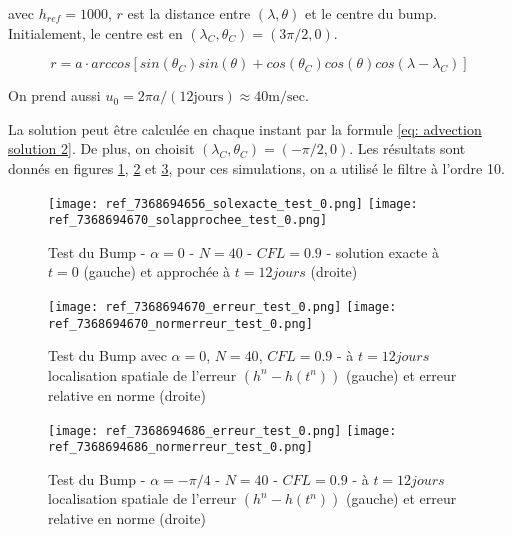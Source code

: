 avec $h_{ref}=1000$, $r$ est la distance entre $(\lambda, \theta)$ et le centre du bump. Initialement, le centre est en $(\lambda_C, \theta_C) = (3 \pi /2, 0)$.

\begin{equation}
r = a \cdot arccos \left[ sin ( \theta_C) sin( \theta) + cos( \theta_C) cos ( \theta) cos ( \lambda - \lambda_C ) \right]
\end{equation}

On prend aussi $u_0 = 2  \pi a / (12 \text{jours} )\approx 40 \text{m/sec}$.

La solution peut être calculée en chaque instant par la formule \eqref{eq: advection solution 2}. De plus, on choisit $(\lambda_C, \theta_C) = ( - \pi/2, 0)$. Les résultats sont donnés en figures \ref{table adv1}, \ref{table adv2} et \ref{table adv3}, pour ces simulations, on a utilisé le filtre à l'ordre 10.


\begin{figure}[ht]
\begin{center}
\texttt{[image: ref\_7368694656\_solexacte\_test\_0.png]}
\texttt{[image: ref\_7368694670\_solapprochee\_test\_0.png]}
\caption{Test du Bump - $\alpha = 0$ - $N=40$ - $CFL=0.9$ - solution exacte à $t=0$ (gauche) et approchée à $t=12 jours$ (droite) }
\label{table adv1}
\end{center}
\end{figure}



\begin{figure}[ht]
\begin{center}
\texttt{[image: ref\_7368694670\_erreur\_test\_0.png]}
\texttt{[image: ref\_7368694670\_normerreur\_test\_0.png]}
\caption{Test du Bump avec $\alpha = 0$, $N=40$, $CFL=0.9$ - à $t=12 jours$ localisation spatiale de l'erreur $( h^n - h(t^n) )$ (gauche) et erreur relative en norme (droite) }
\label{table adv2}
\end{center}
\end{figure}



\begin{figure}[ht]
\begin{center}
\texttt{[image: ref\_7368694686\_erreur\_test\_0.png]}
\texttt{[image: ref\_7368694686\_normerreur\_test\_0.png]}
\caption{Test du Bump - $\alpha = - \pi /4$ - $N=40$ - $CFL=0.9$ - à $t=12 jours$ localisation spatiale de l'erreur $( h^n - h(t^n))$ (gauche) et erreur relative en norme (droite) }
\label{table adv3}
\end{center}
\end{figure}


